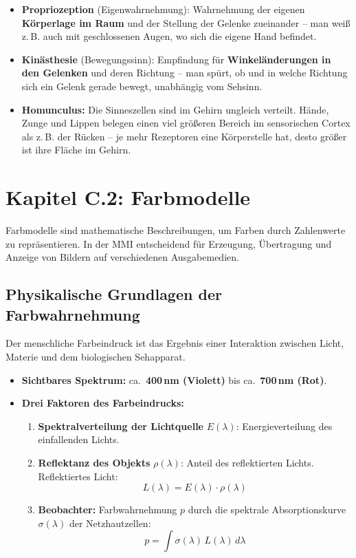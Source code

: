 \documentclass[12pt, a4paper]{article}
\begin{document}
\begin{itemize}
  \item \textbf{Propriozeption} (\glqq{}Eigenwahrnehmung\grqq{}): Wahrnehmung der
        eigenen \textbf{Körperlage im Raum} und der Stellung der Gelenke zueinander
        -- man weiß z.\,B. auch mit geschlossenen Augen, wo sich die eigene Hand
        befindet.
  \item \textbf{Kinästhesie} (\glqq{}Bewegungssinn\grqq{}): Empfindung für
        \textbf{Winkeländerungen in den Gelenken} und deren Richtung -- man spürt,
        ob und in welche Richtung sich ein Gelenk gerade bewegt, unabhängig vom
        Sehsinn.
  \item \textbf{Homunculus:} Die Sinneszellen sind im Gehirn ungleich verteilt.
        Hände, Zunge und Lippen belegen einen viel größeren Bereich im sensorischen
        Cortex als z.\,B. der Rücken -- je mehr Rezeptoren eine Körperstelle hat,
        desto größer ist ihre \glqq{}Fläche\grqq{} im Gehirn.
\end{itemize}


\section{Kapitel C.2: Farbmodelle}

Farbmodelle sind mathematische Beschreibungen, um Farben durch Zahlenwerte zu
repräsentieren. In der MMI entscheidend für Erzeugung, Übertragung und Anzeige
von Bildern auf verschiedenen Ausgabemedien.

\subsection{Physikalische Grundlagen der Farbwahrnehmung}

Der menschliche Farbeindruck ist das Ergebnis einer Interaktion zwischen Licht,
Materie und dem biologischen Sehapparat.

\begin{itemize}
  \item \textbf{Sichtbares Spektrum:} ca.\ \textbf{400\,nm (Violett)} bis
        ca.\ \textbf{700\,nm (Rot)}.
  \item \textbf{Drei Faktoren des Farbeindrucks:}
    \begin{enumerate}
      \item \textbf{Spektralverteilung der Lichtquelle} $E(\lambda)$: Energieverteilung
            des einfallenden Lichts.
      \item \textbf{Reflektanz des Objekts} $\rho(\lambda)$: Anteil des reflektierten
            Lichts. Reflektiertes Licht:
            \[ L(\lambda) = E(\lambda) \cdot \rho(\lambda) \]
      \item \textbf{Beobachter:} Farbwahrnehmung $p$ durch die spektrale
            Absorptionskurve $\sigma(\lambda)$ der Netzhautzellen:
            \[ p = \int \sigma(\lambda)\, L(\lambda)\, d\lambda \]
    \end{enumerate}
\end{itemize}
\end{document}
